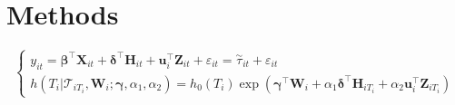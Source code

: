 





% 

\section{Methods}

\begin{equation}\label{eqn:joint}
\left\{
\begin{array}{l}
y_{it} = \boldsymbol{\beta}^{\top}{\boldsymbol X}_{it} + \boldsymbol{\delta}^{\top}{\boldsymbol H}_{it} + {\boldsymbol u}_i^{\top}{\boldsymbol Z}_{it} + \varepsilon_{it} =\overset{\sim}{\tau}_{it} + \varepsilon_{it}\\
h(T_i|\mathcal{T}_{iT_i}, {\boldsymbol W}_i;  \boldsymbol{\gamma}, \alpha_1, 
\alpha_2) = h_0(T_i)\exp(\boldsymbol{\gamma}^{\top}{\boldsymbol W}_i + \alpha_1\boldsymbol{\delta}^{\top}{\boldsymbol H}_{iT_i} + \alpha_2{\boldsymbol u}_i^{\top}{\boldsymbol Z}_{iT_i})
\end{array}
\right.
\end{equation}

%
%
% 


% 